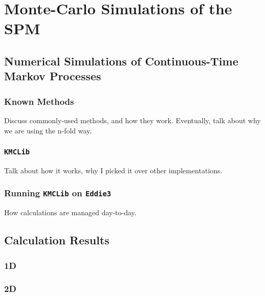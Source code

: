 \chapter{Monte-Carlo Simulations of the SPM} 
\label{sec:numerics}

\section{Numerical Simulations of Continuous-Time Markov Processes}
\subsection{Known Methods}
Discuss commonly-used methods, and how they work. Eventually, talk about why we are using the n-fold way.
\subsection{\texttt{KMCLib}}
Talk about how it works, why I picked it over other implementations.
\subsection{Running \texttt{KMCLib} on \texttt{Eddie3}}
How calculations are managed day-to-day.

\section{Calculation Results }
\subsection{1D}
\subsection{2D}
